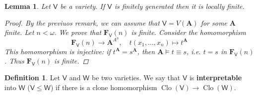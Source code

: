 \documentclass{amsart}
\theoremstyle{plain}
\newtheorem{lemma}[theorem]{Lemma}
\theoremstyle{definition}
\newtheorem{definition}[theorem]{Definition}
\theoremstyle{remark}
\DeclareMathOperator{\Clo}{Clo}
\begin{document}
\begin{lemma}
    \label{loc_fin}
    Let $\mathsf{V}$ be a variety. 
    If $\mathsf{V}$ is finitely generated then it is locally finite. 
    \begin{proof}
    
        By the previuos remark, we can assume that $\mathsf{V}=V(\mathbf{A})$ for some $\mathbf{A}$ finite. 
        Let $n < \omega$. 
        We prove that $\mathbf{F}_{\mathsf{V}}(n)$ is finite. 
        Consider the homomorphism
        \begin{equation*}
            \mathbf{F}_{\mathsf{V}}(n) \to \mathbf{A}^{A^n}, \quad t(x_1, \ldots, x_n) \mapsto t^\mathbf{A}
        \end{equation*}
        This homomorphism is injective: if $t^\mathbf{A} = s^\mathbf{A}$, then $\mathbf{A} \models t \equiv s$, i.e. $t=s$ in $\mathbf{F}_{\mathsf{V}}(n)$. 
        Thus $\mathbf{F}_{\mathsf{V}}(n)$ is finite. 
    \end{proof}
\end{lemma}

\begin{definition}
    Let $\mathsf{V}$ and $\mathsf{W}$ be two varieties. 
    We say that $\mathsf{V}$ is \textbf{interpretable} into $\mathsf{W}$ ($\mathsf{V} \le \mathsf{W}$) if there is a clone homomorphism $\Clo(\mathsf{V}) \to \Clo(\mathsf{W})$. 
\end{definition}
\end{document}
